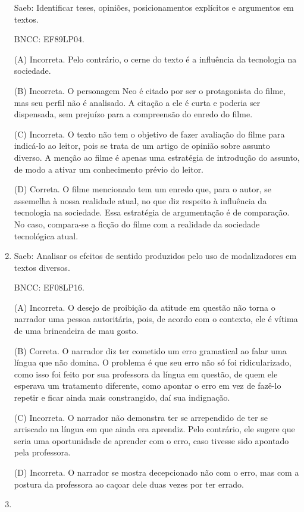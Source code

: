 \begin{enumerate}
Saeb: Identificar teses, opiniões, posicionamentos explícitos e
argumentos em textos.

BNCC: EF89LP04.

(A) Incorreta. Pelo contrário, o cerne do texto é a influência da
tecnologia na sociedade.

(B) Incorreta. O personagem Neo é citado por ser o protagonista do
filme, mas seu perfil não é analisado. A citação a ele é curta e poderia
ser dispensada, sem prejuízo para a compreensão do enredo do filme.

(C) Incorreta. O texto não tem o objetivo de fazer avaliação do filme
para indicá-lo ao leitor, pois se trata de um artigo de opinião sobre
assunto diverso. A menção ao filme é apenas uma estratégia de introdução
do assunto, de modo a ativar um conhecimento prévio do leitor.

(D) Correta. O filme mencionado tem um enredo que, para o autor, se
assemelha à nossa realidade atual, no que diz respeito à influência da
tecnologia na sociedade. Essa estratégia de argumentação é de
comparação. No caso, compara-se a ficção do filme com a realidade da
sociedade tecnológica atual.

\item

Saeb: Analisar os efeitos de sentido produzidos pelo uso de
modalizadores em textos diversos.

BNCC: EF08LP16.

(A) Incorreta. O desejo de proibição da atitude em questão não torna o
narrador uma pessoa autoritária, pois, de acordo com o contexto, ele é
vítima de uma brincadeira de mau gosto.

(B) Correta. O narrador diz ter cometido um erro gramatical ao falar uma
língua que não domina. O problema é que seu erro não só foi
ridicularizado, como isso foi feito por sua professora da língua em
questão, de quem ele esperava um tratamento diferente, como apontar o
erro em vez de fazê-lo repetir e ficar ainda mais constrangido, daí sua
indignação.

(C) Incorreta. O narrador não demonstra ter se arrependido de ter se
arriscado na língua em que ainda era aprendiz. Pelo contrário, ele
sugere que seria uma oportunidade de aprender com o erro, caso tivesse
sido apontado pela professora.

(D) Incorreta. O narrador se mostra decepcionado não com o erro, mas com
a postura da professora ao caçoar dele duas vezes por ter errado.

\item


\end{enumerate}
